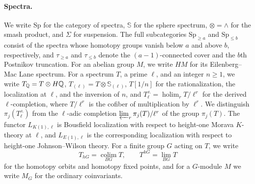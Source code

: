 \paragraph{Spectra.}
We write $\mathrm{Sp}$ for the category of spectra, $\mathbb S$ for the sphere spectrum, $\otimes=\wedge$ for the smash product, and $\Sigma$ for suspension.
The full subcategories $\mathrm{Sp}_{\ge a}$ and $\mathrm{Sp}_{\le b}$ consist of the spectra whose homotopy groups vanish below $a$ and above $b$, respectively, and $\tau_{\ge a}$ and $\tau_{\le b}$ denote the $(a-1)$-connected cover and the $b$th Postnikov truncation.
For an abelian group $M$, we write $HM$ for its Eilenberg--Mac Lane spectrum.
For a spectrum $T$, a prime $\ell$, and an integer $n\ge1$, we write
\(
 T_{\mathbb Q}=T\otimes H\mathbb Q\), \(T_{(\ell)}=T\otimes\mathbb S_{(\ell)}\), \(T[1/n]\)
for the rationalization, the localization at $\ell$, and the inversion of $n$, and
\(
 T^\wedge_\ell=\operatorname*{holim}_rT/\ell^r
\)
for the derived $\ell$-completion, where $T/\ell^r$ is the cofiber of multiplication by $\ell^r$.
We distinguish $\pi_j(T^\wedge_\ell)$ from the $\ell$-adic completion $\varprojlim_r\pi_j(T)/\ell^r$ of the group $\pi_j(T)$.
The functor $L_{K(1),\ell}$ is Bousfield localization with respect to height-one Morava $K$-theory at $\ell$, and $L_{E(1),\ell}$ is the corresponding localization with respect to height-one Johnson--Wilson theory.
For a finite group $G$ acting on $T$, we write
\[
 T_{hG}=\operatorname*{colim}_{BG}T,\qquad T^{hG}=\operatorname*{lim}_{BG}T
\]
for the homotopy orbits and homotopy fixed points, and for a $G$-module $M$ we write $M_G$ for the ordinary coinvariants.
